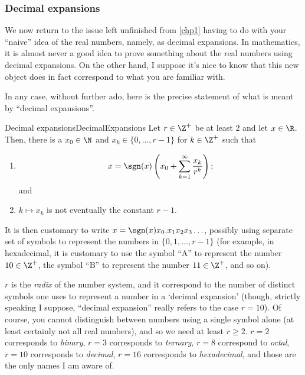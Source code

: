 \subsubsection{Decimal expansions}\label{sssDecimalExpansions}

We now return to the issue left unfinished from \cref{chp1} having to do with your ``naive'' idea of the real numbers, namely, as decimal expansions.  In mathematics, it is almost never a good idea to prove something about the real numbers using decimal expansions.  On the other hand, I suppose it's nice to know that this new object does in fact correspond to what you are familiar with.

In any case, without further ado, here is the precise statement of what is meant by ``decimal expansions''.
\begin{thm}{Decimal expansions}{DecimalExpansions}
Let $r\in \Z ^+$ be at least $2$ and let $x\in \R$.  Then, there is a $x_0\in \N$ and $x_k\in \{ 0,\ldots ,r-1\}$ for $k\in \Z ^+$ such that
\begin{enumerate}
\item \label{DecimalExpansions.i}
\begin{equation}
x=\sgn (x)\left( x_0+\sum _{k=1}^{\infty}\frac{x_k}{r^k}\right) ;
\end{equation}
and
\item \label{DecimalExpansions.ii}$k\mapsto x_k$ is not eventually the constant $r-1$.
\end{enumerate}
\begin{rmk}
It is then customary to write $x=\sgn (x)x_0.x_1x_2x_3\ldots$, possibly using separate set of symbols to represent the numbers in $\{ 0,1,\ldots ,r-1\}$ (for example, in hexadecimal, it is customary to use the symbol ``$\text{A}$'' to represent the number $10\in \Z ^+$, the symbol ``$\text{B}$'' to represent the number $11\in \Z ^+$, and so on).
\end{rmk}
\begin{rmk}
$r$ is the \emph{radix} of the number system, and it correspond to the number of distinct symbols one uses to represent a number in a `decimal expansion' (though, strictly speaking I suppose, ``decimal expansion'' really refers to the case $r=10$).  Of course, you cannot distinguish between numbers using a single symbol alone (at least certainly not all real numbers), and so we need at least $r\geq 2$.  $r=2$ corresponds to \emph{binary}, $r=3$ corresponds to \emph{ternary}, $r=8$ correspond to \emph{octal}, $r=10$ corresponds to \emph{decimal}, $r=16$ corresponds to \emph{hexadecimal}, and those are the only names I am aware of.

\end{rmk}
\end{thm}
